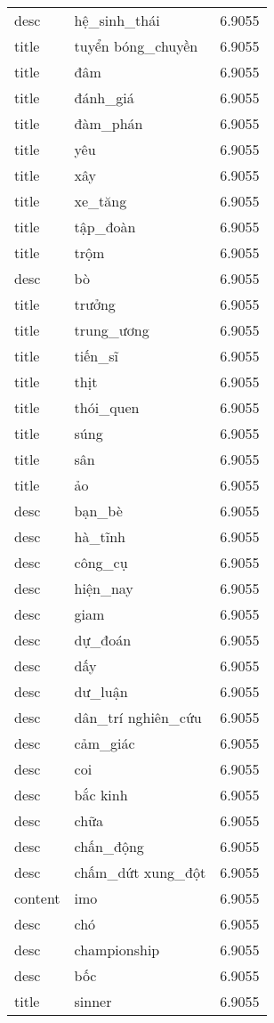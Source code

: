\documentclass{article}
\begin{document}
\begin{tabular}{lll}
desc & hệ\_sinh\_thái & 6.9055\\
title & tuyển bóng\_chuyền & 6.9055\\
title & đâm & 6.9055\\
title & đánh\_giá & 6.9055\\
title & đàm\_phán & 6.9055\\
title & yêu & 6.9055\\
title & xây & 6.9055\\
title & xe\_tăng & 6.9055\\
title & tập\_đoàn & 6.9055\\
title & trộm & 6.9055\\
desc & bò & 6.9055\\
title & trưởng & 6.9055\\
title & trung\_ương & 6.9055\\
title & tiến\_sĩ & 6.9055\\
title & thịt & 6.9055\\
title & thói\_quen & 6.9055\\
title & súng & 6.9055\\
title & sân & 6.9055\\
title & ảo & 6.9055\\
desc & bạn\_bè & 6.9055\\
desc & hà\_tĩnh & 6.9055\\
desc & công\_cụ & 6.9055\\
desc & hiện\_nay & 6.9055\\
desc & giam & 6.9055\\
desc & dự\_đoán & 6.9055\\
desc & dấy & 6.9055\\
desc & dư\_luận & 6.9055\\
desc & dân\_trí nghiên\_cứu & 6.9055\\
desc & cảm\_giác & 6.9055\\
desc & coi & 6.9055\\
desc & bắc kinh & 6.9055\\
desc & chữa & 6.9055\\
desc & chấn\_động & 6.9055\\
desc & chấm\_dứt xung\_đột & 6.9055\\
content & imo & 6.9055\\
desc & chó & 6.9055\\
desc & championship & 6.9055\\
desc & bốc & 6.9055\\
title & sinner & 6.9055\\

\end{tabular}
\end{document}
